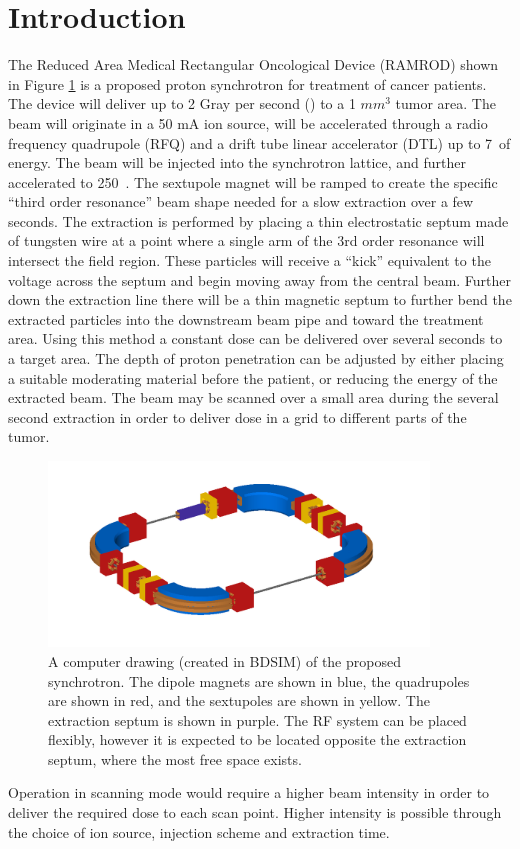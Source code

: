 \section{Introduction}

The Reduced Area Medical Rectangular Oncological Device (RAMROD) shown in Figure \ref{fig:ram} is a proposed proton synchrotron for treatment of cancer patients.  
The device will deliver up to 2
Gray per second (\gs) to a 1 $mm^3$ tumor area.  The beam will originate in a 50 mA ion source, will be accelerated through a radio frequency quadrupole (RFQ) and 
a drift tube linear accelerator (DTL) up to 7~\mev of energy. The beam will be injected into the synchrotron lattice, and further accelerated to 250~\mev.  The sextupole 
magnet will be ramped to create the specific ``third order resonance'' 
beam shape needed for a slow extraction over a few seconds. The extraction is 
performed by placing a thin electrostatic septum made of tungsten wire 
at a point where a single arm of the 3rd order resonance will intersect the field region.  These
particles will receive a ``kick'' equivalent to the voltage across the septum 
and begin moving away from the central beam.  Further down the extraction line there will be a thin magnetic septum to further bend the extracted
particles into the downstream beam pipe and toward the treatment area.  Using this method a constant dose can be delivered over several seconds to a target area.  
The depth of 
proton penetration can be adjusted by either placing a suitable moderating material before the patient, or reducing the energy of the extracted beam.  The beam may be 
scanned over a small area during the several second extraction in order to deliver dose in a grid to different parts of the tumor.  
\begin{figure}[h]
  \begin{center}
    \includegraphics[width=0.9\textwidth]{ramrod.png}
    \caption{A computer drawing (created in BDSIM) of the proposed synchrotron.  The dipole magnets are shown in blue,
    the quadrupoles are shown in red, and the sextupoles are shown in yellow.  The extraction septum is shown in purple. The RF system can be placed flexibly, however 
  it is expected to be located opposite the extraction septum, where the most free space exists.}
  \end{center}
  \label{fig:ram}
\end{figure}
Operation in scanning mode would require a higher beam intensity in order to deliver the required dose to each scan point.  Higher intensity is possible through the choice
of ion source, injection scheme and extraction time. 


